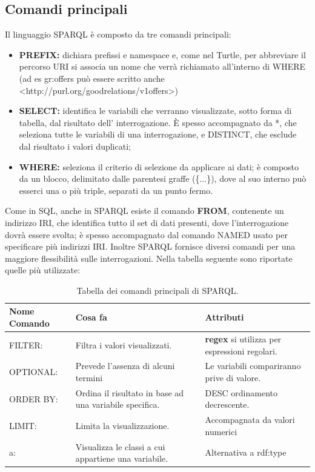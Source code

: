 \documentclass[a4paper,11pt]{article}
\begin{document}
\subsection{Comandi principali}
\label{sec:4.2}
Il linguaggio SPARQL è composto da tre comandi principali:
\begin{itemize}
	\item \textbf{PREFIX:} dichiara prefissi e namespace e, come nel Turtle, per
abbreviare il percorso URI si associa un nome che verrà
richiamato all'interno di WHERE (ad es gr:offers può essere
scritto anche <http://purl.org/goodrelations/v1offers>)
	\item \textbf{SELECT:} identifica le variabili che verranno visualizzate, sotto forma di tabella, dal risultato dell' interrogazione. È spesso
accompagnato da *, che seleziona tutte le variabili di una
interrogazione, e DISTINCT, che esclude dal risultato i valori
duplicati;
	\item \textbf{WHERE:} seleziona il criterio di selezione da applicare ai dati; è composto da un blocco, delimitato dalle parentesi graffe (\{...\}),
dove al suo interno può esserci una o più triple, separati da un
punto fermo.
	\end{itemize}
Come in SQL, anche in SPARQL esiste il comando \textbf{FROM}, contenente un
indirizzo IRI, che identifica tutto il set di dati presenti, dove l'interrogazione dovrà essere svolta; è spesso accompagnato dal comando NAMED usato per specificare più indirizzi IRI.
Inoltre SPARQL fornisce diversi comandi per una maggiore flessibilità sulle
interrogazioni. Nella tabella seguente sono riportate quelle più utilizzate:
\begin{table}[htb]
\begin{center}				
\begin{tabular}{|>{\small}l|>{\small}l|>{\small}l|}
	\hline \textbf{Nome Comando} & \textbf{Cosa fa} & \textbf{Attributi}\\				\hline FILTER: & Filtra i valori visualizzati. & \textbf{regex} si utilizza per espressioni regolari.\\
	\hline OPTIONAL: & Prevede l'assenza di alcuni termini & Le variabili compariranno prive di valore.\\
	\hline ORDER BY: & Ordina il risultato in base ad una variabile specifica. & DESC ordinamento decrescente. \\
	\hline LIMIT: & Limita la visualizzazione. & Accompagnata da valori numerici \\
	\hline a:	& Visualizza le classi a cui appartiene una variabile. & Alternativa a rdf:type\\
	\hline			
\end{tabular}	
\caption{Tabella dei comandi principali di SPARQL.}	
\end{center}	
\end{table}
\newpage
\end{document}
